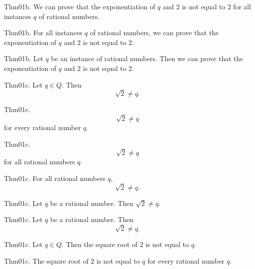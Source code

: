 \documentclass{article}
\begin{document}
Thm01b. We can prove that the exponentiation of $q$ and $2$ is not equal to $2$ for all instances $q$ of rational numbers.

Thm01b. For all instances $q$ of rational numbers, we can prove that the exponentiation of $q$ and $2$ is not equal to $2$.

Thm01b. Let $q$ be an instance of rational numbers. Then we can prove that the exponentiation of $q$ and $2$ is not equal to $2$.

Thm01c. Let $q \in Q$. Then $$\sqrt{ 2}\neq q.$$

Thm01c. $$\sqrt{ 2}\neq q$$ for every rational number $q$.

Thm01c. $$\sqrt{ 2}\neq q$$ for all rational numbers $q$.

Thm01c. For all rational numbers $q$, $$\sqrt{ 2}\neq q.$$

Thm01c. Let $q$ be a rational number. Then $\sqrt{ 2}\neq q$.

Thm01c. Let $q$ be a rational number. Then $$\sqrt{ 2}\neq q.$$

Thm01c. Let $q \in Q$. Then the square root of $2$ is not equal to $q$.

Thm01c. The square root of $2$ is not equal to $q$ for every rational number $q$.
\end{document}
